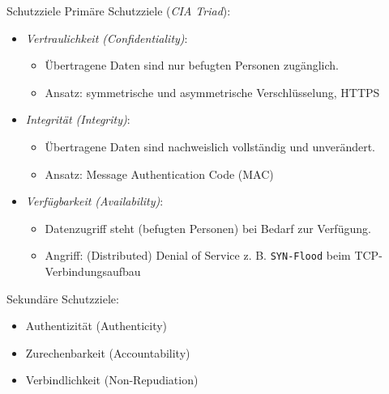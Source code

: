 \begin{defi}{Schutzziele}
    Primäre Schutzziele (\emph{CIA Triad}):
    \begin{itemize}
        \item \emph{Vertraulichkeit (Confidentiality)}:
              \begin{itemize}
                  \item Übertragene Daten sind nur befugten Personen zugänglich.
                  \item Ansatz: symmetrische und asymmetrische Verschlüsselung, HTTPS
              \end{itemize}
        \item \emph{Integrität (Integrity)}:
              \begin{itemize}
                  \item Übertragene Daten sind nachweislich vollständig und unverändert.
                  \item Ansatz: Message Authentication Code (MAC)
              \end{itemize}
        \item \emph{Verfügbarkeit (Availability)}:
              \begin{itemize}
                  \item Datenzugriff steht (befugten Personen) bei Bedarf zur Verfügung.
                  \item Angriff: (Distributed) Denial of Service z. B. \texttt{SYN-Flood} beim TCP-Verbindungsaufbau
              \end{itemize}
    \end{itemize}

    Sekundäre Schutzziele:
    \begin{itemize}
        \item Authentizität (Authenticity)
        \item Zurechenbarkeit (Accountability)
        \item Verbindlichkeit (Non-Repudiation)
    \end{itemize}
\end{defi}

